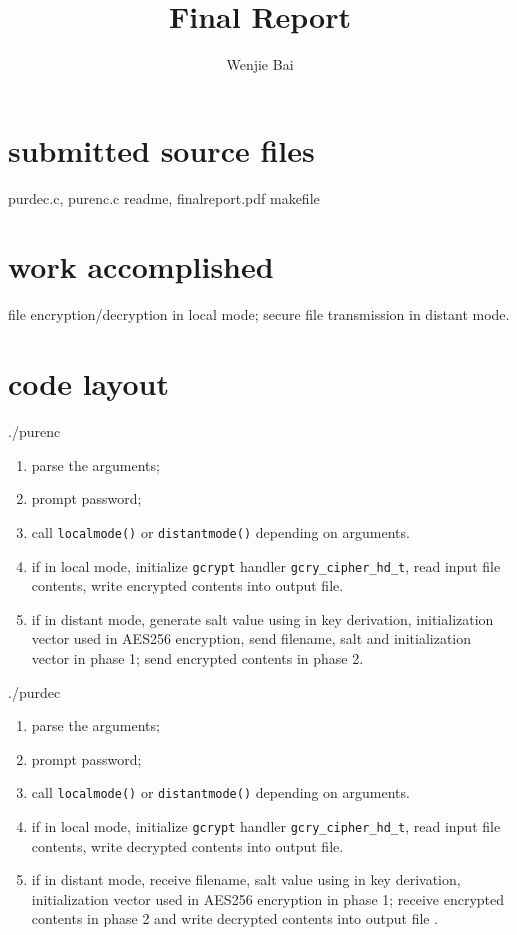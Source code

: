 \documentclass[11pt, oneside]{article}   	%
\title{Final Report}
\author{Wenjie Bai}
\date{}							%
\begin{document}
\maketitle

\section{submitted source files}
purdec.c, purenc.c readme, finalreport.pdf makefile
\section{work accomplished}
file encryption/decryption in local mode; secure file transmission in distant mode. 
\section{code layout}
./purenc

\begin{enumerate}
\item parse the arguments;
\item prompt password;
\item call \texttt{localmode()} or \texttt{distantmode()} depending on arguments.
\item if in local mode,  initialize \texttt{gcrypt} handler \verb|gcry_cipher_hd_t|, read input file contents, write encrypted contents into output file.
\item if in distant mode, generate salt value using in key derivation, initialization vector used in AES256 encryption, send filename, salt and initialization vector in phase 1; send encrypted contents in phase 2.
\end{enumerate}

./purdec

\begin{enumerate}
\item parse the arguments;
\item prompt password;
\item call \texttt{localmode()} or \texttt{distantmode()} depending on arguments.
\item if in local mode,  initialize \texttt{gcrypt} handler \verb|gcry_cipher_hd_t|, read input file contents, write decrypted contents into output file.
\item if in distant mode, receive filename, salt value using in key derivation, initialization vector used in AES256 encryption in phase 1; receive encrypted contents in phase 2 and write decrypted contents into output file .
\end{enumerate}
\end{document}
